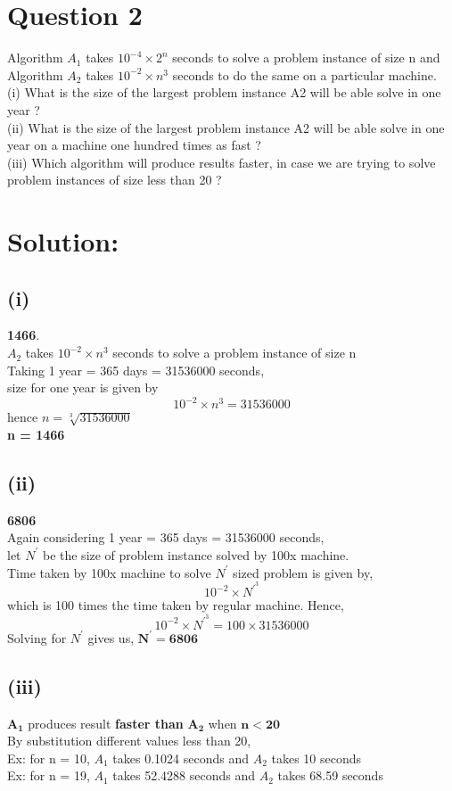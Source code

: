 \documentclass[12pt, letterpaper]{article}
\begin{document}
\section*{Question 2}
Algorithm $A_1$ takes $10^{-4} \times 2^{n}$ seconds to solve a problem instance of size n and Algorithm $A_2$ takes $10^{-2} \times n^{3}$ seconds to do the same on a particular machine.\\(i) What is the size of the largest problem instance A2 will be able solve in one year ?\\(ii) What is the size of the largest problem instance A2 will be able solve in one year on a machine one hundred times as fast ?\\(iii) Which algorithm will produce results faster, in case we are trying to solve problem instances of size less than 20 ?
\section*{Solution:}
\subsection*{(i)} \textbf{1466}. \\$A_2$ takes $10^{-2} \times n^{3}$ seconds to solve a problem instance of size n
\\Taking 1 year = 365 days = 31536000 seconds,  \\size for one year is given by $$ 10^{-2} \times n^{3} = 31536000$$ hence $n = \sqrt[3]{31536000}$\\ \textbf{n = 1466}
\subsection*{(ii)} \textbf{6806} \\Again considering 1 year = 365 days = 31536000 seconds, \\let $N^{'}$ be the size of problem instance solved by 100x machine. \\Time taken by 100x machine to solve $N^{'}$ sized problem is given by, $$ 10^{-2} \times N^{'^{3}}$$ which is 100 times the time taken by regular machine. Hence, $$ 10^{-2} \times N^{'^{3}} = 100 \times 31536000$$ Solving for $N^{'}$ gives us, $\bm{ N^{'} = 6806}$
\subsection*{(iii)} $\bm{ A_1}$ produces result \textbf{faster than} $\bm{ A_2}$ when $\bm{ n < 20}$
\\By substitution different values less than 20, \\Ex: for n = 10, $A_1$ takes 0.1024 seconds and $A_2$ takes 10 seconds\\Ex: for n = 19, $A_1$ takes 52.4288 seconds and $A_2$ takes 68.59 seconds
\end{document}
